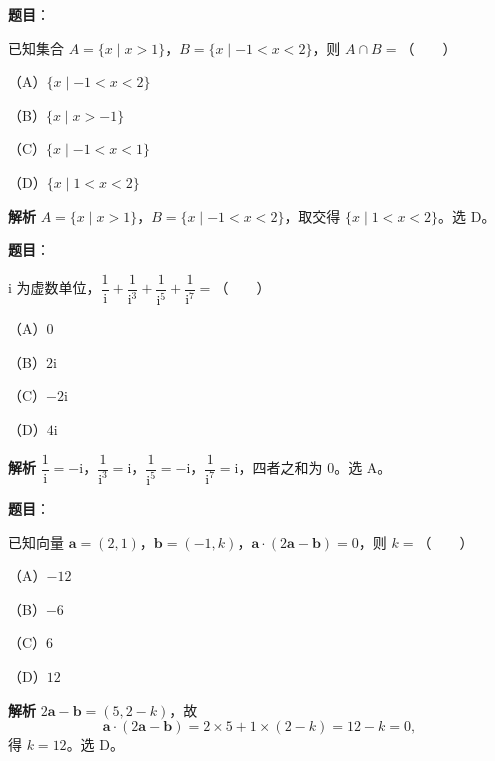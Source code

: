 
\begin{answer}

\textbf{题目}：

已知集合 $A=\{x\mid x>1\}$，$B=\{x\mid-1<x<2\}$，则 $A\cap B=$\mbox{（　　）}

（A）$\{x\mid-1<x<2\}$

（B）$\{x\mid x>-1\}$

（C）$\{x\mid-1<x<1\}$

（D）$\{x\mid1<x<2\}$

\textbf{解析}
$A=\{x\mid x>1\}$，$B=\{x\mid-1<x<2\}$，取交得 $\{x\mid1<x<2\}$。选 D。


\end{answer}
\begin{answer}

\textbf{题目}：

$\mathrm i$ 为虚数单位，$\dfrac1{\mathrm i}+\dfrac1{\mathrm i^3}+\dfrac1{\mathrm i^5}+\dfrac1{\mathrm i^7}=$\mbox{（　　）}

（A）$0$

（B）$2\mathrm i$

（C）$-2\mathrm i$

（D）$4\mathrm i$

\textbf{解析}
$\dfrac1{\mathrm i}=-\mathrm i$，$\dfrac1{\mathrm i^3}=\mathrm i$，$\dfrac1{\mathrm i^5}=-\mathrm i$，$\dfrac1{\mathrm i^7}=\mathrm i$，四者之和为 $0$。选 A。


\end{answer}
\begin{answer}

\textbf{题目}：

已知向量 $\boldsymbol a=(2,1)$，$\boldsymbol b=(-1,k)$，$\boldsymbol a\cdot(2\boldsymbol a-\boldsymbol b)=0$，则 $k=$\mbox{（　　）}

（A）$-12$

（B）$-6$

（C）$6$

（D）$12$

\textbf{解析}
$2\boldsymbol a-\boldsymbol b=(5,2-k)$，故
\nopagebreak[4]
\[\boldsymbol a\cdot(2\boldsymbol a-\boldsymbol b)=2\times5+1\times(2-k)=12-k=0,\]
得 $k=12$。选 D。


\end{answer}
